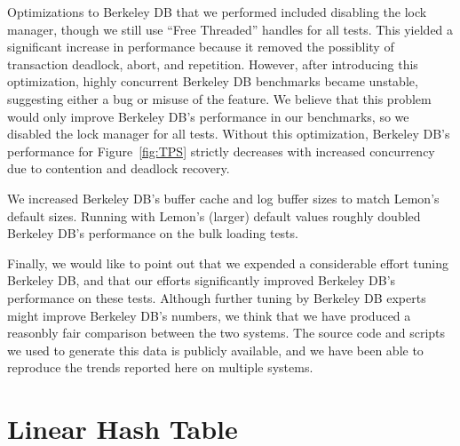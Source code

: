 \documentclass[letterpaper,twocolumn,english]{article}
\newcommand{\yad}{Lemon\xspace}
\begin{document}
Optimizations to Berkeley DB that we performed included disabling the
lock manager, though we still use ``Free Threaded'' handles for all
tests.  This yielded a significant increase in performance because it
removed the possiblity of transaction deadlock, abort, and repetition.
However, after introducing this optimization, highly concurrent
Berkeley DB benchmarks became unstable, suggesting either a bug or
misuse of the feature.  We believe that this problem would only
improve Berkeley DB's performance in our benchmarks, so we disabled
the lock manager for all tests.  Without this optimization, Berkeley
DB's performance for Figure~\ref{fig:TPS} strictly decreases with increased concurrency due to contention and deadlock recovery.

We increased Berkeley DB's buffer cache and log buffer sizes to match
\yad's default sizes.  Running with \yad's (larger) default values
roughly doubled Berkeley DB's performance on the bulk loading tests.

Finally, we would like to point out that we expended a considerable
effort tuning Berkeley DB, and that our efforts significantly
improved Berkeley DB's performance on these tests.  Although further
tuning by Berkeley DB experts might improve Berkeley DB's
numbers, we think that we have produced a reasonbly fair comparison
between the two systems.  The source code and scripts we used to
generate this data is publicly available, and we have been able to
reproduce the trends reported here on multiple systems.


\section{Linear Hash Table\label{sub:Linear-Hash-Table}}



%
\end{document}
